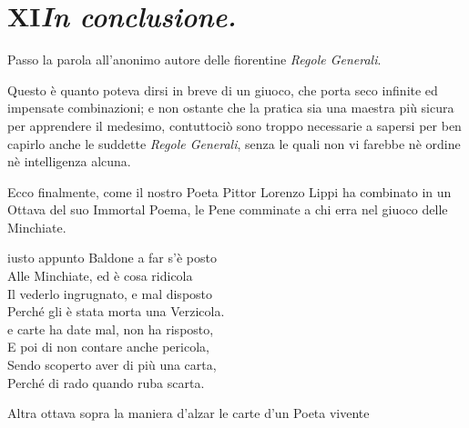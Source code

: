 \documentclass[11pt,a6paper]{article}
\begin{document}
\section{XI\hfill{\large\mdseries\slshape In conclusione.}}

Passo la parola all'anonimo autore delle fiorentine \textit{Regole Generali}.

Questo è quanto poteva dirsi in breve di un giuoco, che porta seco infinite ed impensate combinazioni; e non ostante che la pratica sia una maestra più sicura per apprendere il medesimo, contuttociò sono troppo necessarie a sapersi per ben capirlo anche le suddette \textit{Regole Generali}, senza le quali non vi farebbe nè ordine nè intelligenza alcuna.

Ecco finalmente, come il nostro Poeta Pittor Lorenzo Lippi ha combinato in un Ottava del suo Immortal Poema, le Pene comminate a chi erra nel giuoco delle Minchiate.

\vspace{4pt} \noindent
\begin{minipage}{8cm}
\-\hspace{-6pt}{\LARGE G}iusto appunto Baldone a far s'è posto\\
Alle Minchiate, ed è cosa ridicola \vspace{2pt}\\
Il vederlo ingrugnato, e mal disposto \\
Perché gli è stata morta una Verzicola. \vspace{2pt}\\
\-\hspace{-6pt}{\LARGE L}e carte ha date mal, non ha risposto, \\
E poi di non contare anche pericola, \vspace{2pt}\\
Sendo scoperto aver di più una carta, \\
Perché di rado quando ruba scarta. 
\end{minipage}

\vfill

Altra ottava sopra la maniera d'alzar
le carte d'un Poeta vivente

\vspace{4pt}
\end{document}
